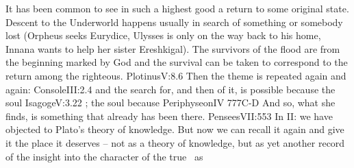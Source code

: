 It has been common to see in such a highest good a return to some original
state. Descent to the Underworld happens usually in search of something or
somebody lost (Orpheus seeks Eurydice, Ulysses is only on the way back to his
home, Innana wants to help her sister Ereshkigal). The survivors of the flood
are from the beginning marked by God and the survival can be taken to correspond
to the return among the righteous.  \citet{This excellence whose necessity is
  scarcely or not at all manifest to search, exists, if we could but find it
  out, before all searching and reasoning.}{Plotinus}{V:8.6} Then the theme is
repeated again and again: \citet{in human soul there is engrafted desire of true
  good}{Console}{III:2.4} and the search for, and then
 of it, is possible because the soul \citet{did not forget itself
  completely}{Isagoge}{V:3.22 \verify{}}; the soul
because \citet{the desire for the bliss, which she had lost, remained with her
  even after the Fall.}{Periphyseon}{IV 777C-D} And so, what she finds, is
something that already has been there.  \citet{Thou wouldst not seek Me, if thou
  hadst not found Me.}{Pensees}{VII:553} In II: we have
objected to Plato's  theory of knowledge. But now we can recall
it again and give it the place it deserves -- not as a theory of knowledge, but
as yet another record of the insight into the character of the true \sch\ as
